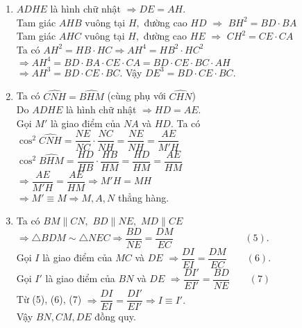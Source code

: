 \begin{ex}
{\begin{enumerate}
Tứ giác $ADHE$ có $\widehat{A} = \widehat{D} =  \widehat{E}  = 90^{\circ}$
  \item $ADHE$ là hình chữ nhật $\Rightarrow DE = AH.$\\
 Tam giác $AHB$ vuông tại $H,$ đường cao $HD$ $\Rightarrow$    $BH^2 = BD \cdot BA$\\
Tam giác $AHC$ vuông tại $H,$ đường cao $HE$ $\Rightarrow$    $CH^2 = CE \cdot CA $\\
Ta có $AH^2 = HB \cdot HC \Rightarrow AH^4 = HB^2 \cdot HC^2$\\
$\Rightarrow AH^4=BD \cdot BA \cdot CE \cdot CA= BD\cdot CE \cdot BC \cdot AH$\\
$\Rightarrow AH^3= BD\cdot CE \cdot BC.$
Vậy $DE^3= BD\cdot CE \cdot BC.$
  \item Ta có $\widehat{CNH} = \widehat{BHM}$ (cùng phụ với $\widehat{CHN}$)\\
Do $ADHE$ là hình chữ nhật $\Rightarrow HD=AE.$\\
Gọi $M'$ là giao điểm của $NA$ và $HD.$ Ta có\\
$\cos^2 \widehat{CNH}=\dfrac{NE}{NC}\cdot \dfrac{NC}{NH}=\dfrac{NE}{NH}=\dfrac{AE}{M'H}$\\
$\cos^2 \widehat{BHM }= \dfrac{HD}{HB}\cdot \dfrac{HB}{HM}= \dfrac{HD}{HM}=\dfrac{AE}{HM}$\\
$\Rightarrow \dfrac{AE}{M'H} = \dfrac{AE}{HM} \Rightarrow M'H= MH$\\
$\Rightarrow M' \equiv M \Rightarrow M,A,N$ thẳng hàng.
  \item Ta có $BM \parallel CN,$ $BD \parallel NE,$ $MD \parallel CE$\\
$\Rightarrow \triangle BDM \sim \triangle NEC \Rightarrow \dfrac{BD}{NE}= \dfrac{DM}{EC} \qquad \qquad \qquad \quad  \; (5). $\\
Gọi $I$ là giao điểm của $MC$ và $DE$ $\Rightarrow \dfrac{DI}{EI}=\dfrac{DM}{EC} \qquad (6).$\\
Gọi $I'$ là giao điểm của $BN$ và $DE$ $\Rightarrow \dfrac{DI'}{EI'}=\dfrac{BD}{NE} \qquad (7)$\\
Từ (5), (6), (7) $\Rightarrow \dfrac{DI}{EI}=\dfrac{DI'}{EI'} \Rightarrow I \equiv I'.$\\
Vậy $BN, CM, DE$ đồng quy.
\end{enumerate}
}
\end{ex}
